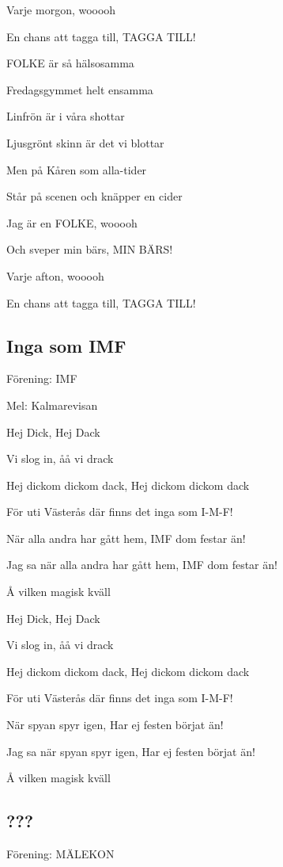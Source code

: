 Varje morgon, wooooh

En chans att tagga till, TAGGA TILL!

FOLKE är så hälsosamma

Fredagsgymmet helt ensamma

Linfrön är i våra shottar

Ljusgrönt skinn är det vi blottar

Men på Kåren som alla-tider

Står på scenen och knäpper en cider

Jag är en FOLKE, wooooh

Och sveper min bärs, MIN BÄRS!

Varje afton, wooooh

En chans att tagga till, TAGGA TILL!\bigskip

\subsection{\textbf{Inga som IMF}}

Förening: IMF

Mel: Kalmarevisan

Hej Dick, Hej Dack

Vi slog in, åå vi drack

Hej dickom dickom dack, Hej dickom dickom dack

För uti Västerås där finns det inga som I-M-F!\bigskip

När alla andra har gått hem, IMF dom festar än!

Jag sa när alla andra har gått hem, IMF dom festar än!

Å vilken magisk kväll\bigskip


Hej Dick, Hej Dack

Vi slog in, åå vi drack

Hej dickom dickom dack, Hej dickom dickom dack

För uti Västerås där finns det inga som I-M-F!\bigskip

När spyan spyr igen, Har ej festen börjat än!

Jag sa när spyan spyr igen, Har ej festen börjat än!

Å vilken magisk kväll\bigskip


\subsection{\textbf{???}}

Förening: MÄLEKON

